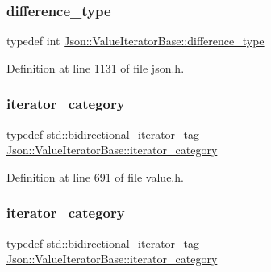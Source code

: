 \subsubsection{\texorpdfstring{difference\+\_\+type}{difference\_type}\hspace{0.1cm}{\footnotesize\ttfamily [2/2]}}
{\footnotesize\ttfamily typedef int \hyperlink{class_json_1_1_value_iterator_base_a4e44bf8cbd17ec8d6e2c185904a15ebd}{Json\+::\+Value\+Iterator\+Base\+::difference\+\_\+type}}



Definition at line 1131 of file json.\+h.

\hypertarget{class_json_1_1_value_iterator_base_a02fd11a4fbdc0007da1e8bcf5e6b83c3}{}\label{class_json_1_1_value_iterator_base_a02fd11a4fbdc0007da1e8bcf5e6b83c3} 
\subsubsection{\texorpdfstring{iterator\+\_\+category}{iterator\_category}\hspace{0.1cm}{\footnotesize\ttfamily [1/2]}}
{\footnotesize\ttfamily typedef std\+::bidirectional\+\_\+iterator\+\_\+tag \hyperlink{class_json_1_1_value_iterator_base_a02fd11a4fbdc0007da1e8bcf5e6b83c3}{Json\+::\+Value\+Iterator\+Base\+::iterator\+\_\+category}}



Definition at line 691 of file value.\+h.

\hypertarget{class_json_1_1_value_iterator_base_a02fd11a4fbdc0007da1e8bcf5e6b83c3}{}\label{class_json_1_1_value_iterator_base_a02fd11a4fbdc0007da1e8bcf5e6b83c3} 
\subsubsection{\texorpdfstring{iterator\+\_\+category}{iterator\_category}\hspace{0.1cm}{\footnotesize\ttfamily [2/2]}}
{\footnotesize\ttfamily typedef std\+::bidirectional\+\_\+iterator\+\_\+tag \hyperlink{class_json_1_1_value_iterator_base_a02fd11a4fbdc0007da1e8bcf5e6b83c3}{Json\+::\+Value\+Iterator\+Base\+::iterator\+\_\+category}}




